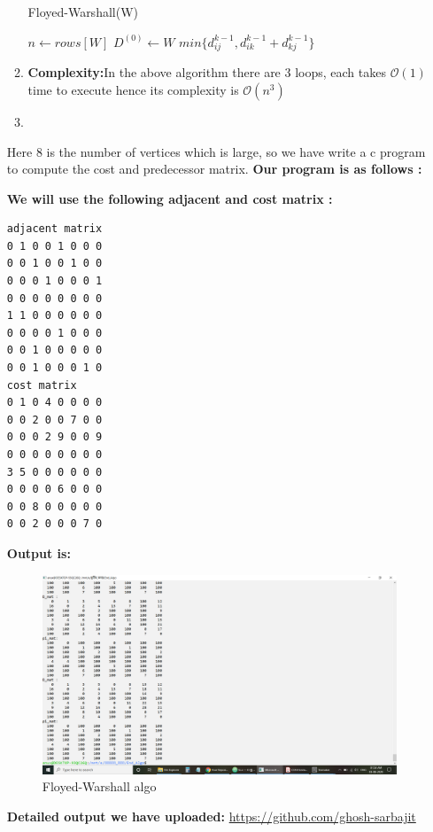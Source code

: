 \documentclass[12pt,a4paper,final]{article}
\theoremstyle{definition}
\begin{document}
\begin{enumerate}
\begin{enumerate}
\begin{algorithm}[H]
\caption{Floyed-Warshall(W)}
\begin{algorithmic}[1]
\State $n \gets rows[W]$
\State $D^{(0)}\gets W$
		  		 \State $min \{ d^{k-1}_{ij}, d^{k-1}_{ik} + d^{k-1}_{kj} \}$
		  \EndFor 
	\EndFor
\EndFor
\end{algorithmic}
\end{algorithm}

\item
\textbf{Complexity:}In the above algorithm there are 3 loops, each takes $\mathcal{O}(1)$ time to execute hence its complexity is $\mathcal{O}(n^3)$

\item
\end{enumerate}
Here 8 is the number of vertices which is large, so we have write a c program to compute the cost and predecessor matrix.
\textbf{Our  program is as follows :}

\textbf{We will use the following adjacent and cost matrix :}

\begin{verbatim}
adjacent matrix
0 1 0 0 1 0 0 0
0 0 1 0 0 1 0 0
0 0 0 1 0 0 0 1
0 0 0 0 0 0 0 0
1 1 0 0 0 0 0 0
0 0 0 0 1 0 0 0
0 0 1 0 0 0 0 0
0 0 1 0 0 0 1 0
cost matrix
0 1 0 4 0 0 0 0
0 0 2 0 0 7 0 0
0 0 0 2 9 0 0 9
0 0 0 0 0 0 0 0
3 5 0 0 0 0 0 0
0 0 0 0 6 0 0 0
0 0 8 0 0 0 0 0
0 0 2 0 0 0 7 0
\end{verbatim}

\textbf{Output is: }
\begin{figure}[H]
\includegraphics[width=1.0\textwidth]{5c.png}
\caption{Floyed-Warshall algo}
\label{fig:5c}
\end{figure}

\textbf{Detailed output we have uploaded: } \url{https://github.com/ghosh-sarbajit}



\end{enumerate}
\end{document}
